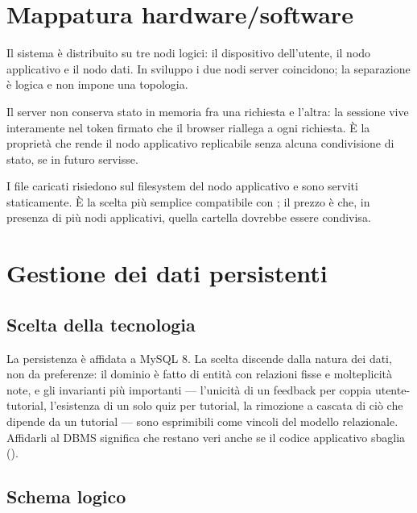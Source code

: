 \section{Mappatura hardware/software}
\label{sec:sdd-deployment}

Il sistema è distribuito su tre nodi logici: il dispositivo dell'utente, il
nodo applicativo e il nodo dati. In sviluppo i due nodi server coincidono; la
separazione è logica e non impone una topologia.


Il server non conserva stato in memoria fra una richiesta e l'altra: la
sessione vive interamente nel token firmato che il browser riallega a ogni
richiesta. È la proprietà che rende il nodo applicativo replicabile senza
alcuna condivisione di stato, se in futuro servisse.

I file caricati risiedono sul filesystem del nodo applicativo e sono serviti
staticamente. È la scelta più semplice compatibile con ; il prezzo
è che, in presenza di più nodi applicativi, quella cartella dovrebbe essere
condivisa.

\section{Gestione dei dati persistenti}
\label{sec:sdd-persistenza}

\subsection{Scelta della tecnologia}

La persistenza è affidata a MySQL 8. La scelta discende dalla natura dei
dati, non da preferenze: il dominio è fatto di entità con relazioni fisse e
molteplicità note, e gli invarianti più importanti — l'unicità di un feedback
per coppia utente-tutorial, l'esistenza di un solo quiz per tutorial, la
rimozione a cascata di ciò che dipende da un tutorial — sono esprimibili come
vincoli del modello relazionale. Affidarli al DBMS significa che restano veri
anche se il codice applicativo sbaglia ().

\subsection{Schema logico}



